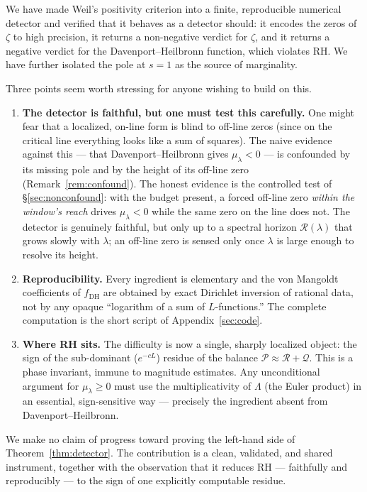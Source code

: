 \documentclass[11pt]{amsart}
\theoremstyle{definition}
\theoremstyle{remark}
\newcommand{\lam}{\lambda}
\begin{document}
We have made Weil's positivity criterion into a finite, reproducible numerical detector and verified that it behaves as a detector should: it encodes the zeros of $\zeta$ to high precision, it returns a non-negative verdict for $\zeta$, and it returns a negative verdict for the Davenport--Heilbronn function, which violates RH. We have further isolated the pole at $s=1$ as the source of marginality.

Three points seem worth stressing for anyone wishing to build on this.

\begin{enumerate}[leftmargin=*]
\item \textbf{The detector is faithful, but one must test this carefully.} One might fear that a localized, on-line form is blind to off-line zeros (since on the critical line everything looks like a sum of squares). The naive evidence against this --- that Davenport--Heilbronn gives $\mu_\lam<0$ --- is confounded by its missing pole and by the height of its off-line zero (Remark~\ref{rem:confound}). The honest evidence is the controlled test of \S\ref{sec:nonconfound}: with the budget present, a forced off-line zero \emph{within the window's reach} drives $\mu_\lam<0$ while the same zero on the line does not. The detector is genuinely faithful, but only up to a spectral horizon $\mathcal R(\lam)$ that grows slowly with $\lam$; an off-line zero is sensed only once $\lam$ is large enough to resolve its height.
\item \textbf{Reproducibility.} Every ingredient is elementary and the von Mangoldt coefficients of $f_{\mathrm{DH}}$ are obtained by exact Dirichlet inversion of rational data, not by any opaque ``logarithm of a sum of $L$-functions.'' The complete computation is the short script of Appendix~\ref{sec:code}.
\item \textbf{Where RH sits.} The difficulty is now a single, sharply localized object: the sign of the sub-dominant ($e^{-cL}$) residue of the balance $\mathcal P\approx\mathcal R+\mathcal Q$. This is a phase invariant, immune to magnitude estimates. Any unconditional argument for $\mu_\lam\ge 0$ must use the multiplicativity of $\Lambda$ (the Euler product) in an essential, sign-sensitive way --- precisely the ingredient absent from Davenport--Heilbronn.
\end{enumerate}

We make no claim of progress toward proving the left-hand side of Theorem~\ref{thm:detector}. The contribution is a clean, validated, and shared instrument, together with the observation that it reduces RH --- faithfully and reproducibly --- to the sign of one explicitly computable residue.
\end{document}
